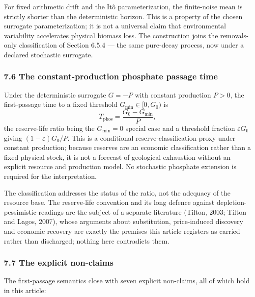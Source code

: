 \documentclass[11pt]{article}
\begin{document}
For fixed arithmetic drift and the It\^o parameterization, the
finite-noise mean is strictly shorter than the deterministic horizon.
This is a property of the chosen surrogate parameterization; it is not a
universal claim that environmental variability accelerates physical
biomass loss. The construction joins the removals-only classification of
Section 6.5.4 --- the same pure-decay process, now under a declared
stochastic surrogate.

\subsubsection{7.6 The constant-production phosphate passage
time}\label{the-constant-production-phosphate-passage-time}

Under the deterministic surrogate \(\dot G = -P\) with constant
production \(P > 0\), the first-passage time to a fixed threshold
\(G_{\min} \in [0, G_0)\) is
\[T_{\mathrm{phos}} = \frac{G_0 - G_{\min}}{P},\] the reserve-life ratio
being the \(G_{\min} = 0\) special case and a threshold fraction
\(\varepsilon G_0\) giving \((1-\varepsilon)G_0/P\). This is a
conditional reserve-classification proxy under constant production;
because reserves are an economic classification rather than a fixed
physical stock, it is not a forecast of geological exhaustion without an
explicit resource and production model. No stochastic phosphate
extension is required for the interpretation.

The classification addresses the status of the ratio, not the adequacy of the resource base. The
reserve-life convention and its long defence against depletion-pessimistic readings are the subject of
a separate literature (Tilton, 2003; Tilton and Lagos, 2007), whose arguments about substitution,
price-induced discovery and economic recovery are exactly the premises this article registers as
carried rather than discharged; nothing here contradicts them.


\subsubsection{7.7 The explicit
non-claims}\label{the-explicit-non-claims}

The first-passage semantics close with seven explicit non-claims, all of
which hold in this article:
\end{document}
